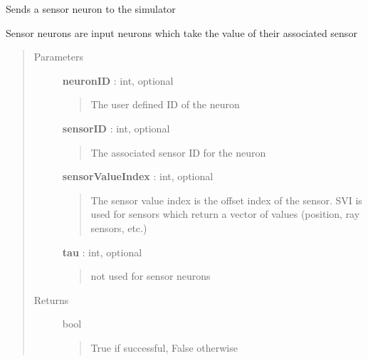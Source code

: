 \documentclass[letterpaper,10pt,english]{sphinxmanual}
\begin{document}
\begin{fulllineitems}
\begin{fulllineitems}
\begin{quote}
\begin{description}
\end{description}\end{quote}

\end{fulllineitems}


\begin{fulllineitems}
\label{code:pyrosim.PYROSIM.Send_Sensor_Neuron}
Sends a sensor neuron to the simulator

Sensor neurons are input neurons which take the value of their associated sensor
\begin{quote}\begin{description}
\item[{Parameters}] \leavevmode
\textbf{neuronID} : int, optional
\begin{quote}

The user defined ID of the neuron
\end{quote}

\textbf{sensorID} : int, optional
\begin{quote}

The associated sensor ID for the neuron
\end{quote}

\textbf{sensorValueIndex} : int, optional
\begin{quote}

The sensor value index is the offset index of the sensor. SVI is used for 
sensors which return a vector of values (position, ray sensors, etc.)
\end{quote}

\textbf{tau} : int, optional
\begin{quote}

not used for sensor neurons
\end{quote}

\item[{Returns}] \leavevmode
bool
\begin{quote}

True if successful, False otherwise
\end{quote}

\end{description}\end{quote}

\end{fulllineitems}


\end{fulllineitems}
\end{document}
